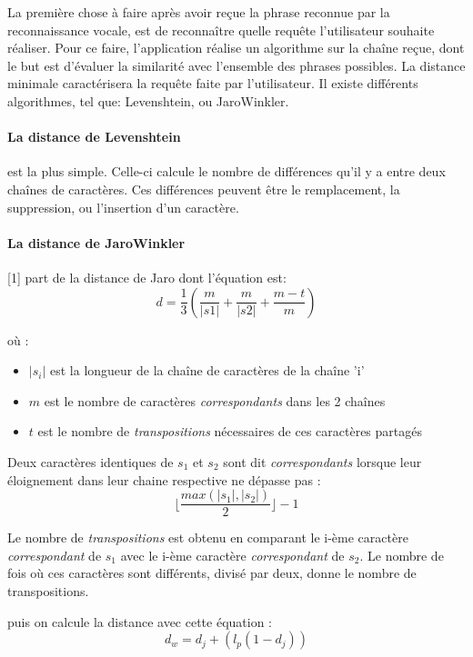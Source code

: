 La première chose à faire après avoir reçue la phrase reconnue par la reconnaissance vocale, est de 
reconnaître quelle requête l'utilisateur souhaite réaliser. Pour ce faire, l'application réalise un algorithme 
sur la chaîne reçue, dont le but est d'évaluer la similarité avec l'ensemble des 
phrases possibles. La distance minimale caractérisera la requête faite par l'utilisateur. Il existe 
différents algorithmes, tel que: Levenshtein, ou JaroWinkler.

\paragraph{La distance de Levenshtein}est la plus simple. Celle-ci calcule le nombre de différences 
qu'il y a entre deux chaînes de caractères. Ces différences peuvent être le remplacement, la suppression, ou 
l'insertion d'un caractère.

\paragraph{La distance de JaroWinkler}[1] part de la distance de Jaro dont l'équation est:
\begin{equation}
 d = \frac{1}{3}(\frac{m}{|s1|}+\frac{m}{|s2|}+\frac{m-t}{m})
\end{equation}

où :
\begin{itemize}
 \item $|s_i|$ est la longueur de la chaîne de caractères de la chaîne 'i'
 \item $m$ est le nombre de caractères \emph{correspondants} dans les 2 chaînes
 \item $t$ est le nombre de \emph{transpositions} nécessaires de ces caractères partagés
\end{itemize}

Deux caractères identiques de $s_1$ et $s_2$ sont dit \emph{correspondants} lorsque leur éloignement dans 
leur chaine respective ne dépasse pas :
\begin{equation}
 \lfloor{\frac{max(|s_1|, |s_2|)}{2}}\rfloor - 1
\end{equation}

Le nombre de \emph{transpositions} est obtenu en comparant le i-ème caractère \emph{correspondant} de $s_1$ 
avec le i-ème caractère \emph{correspondant} de $s_2$. Le nombre de fois où ces caractères sont différents, 
divisé par deux, donne le nombre de transpositions.

puis on calcule la distance avec cette équation :
\begin{equation}
 d_w = d_j + (l_p(1-d_j))
\end{equation}

